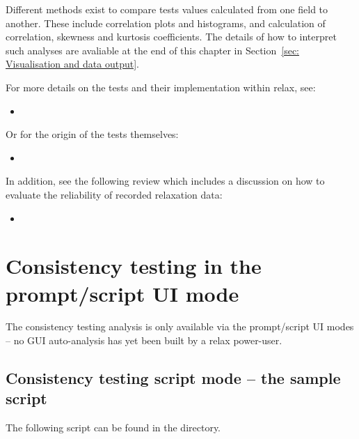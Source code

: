 Different methods exist to compare tests values calculated from one field to another.
These include correlation plots and histograms, and calculation of correlation, skewness and kurtosis coefficients.
The details of how to interpret such analyses are avaliable at the end of this chapter in Section~\ref{sec: Visualisation and data output}.

For more details on the tests and their implementation within relax, see:
\begin{itemize}
  \item {}
\end{itemize}

Or for the origin of the tests themselves:
\begin{itemize}
  \item {}
\end{itemize}

In addition, see the following review which includes a discussion on how to evaluate the reliability of recorded relaxation data:
\begin{itemize}
  \item {}
\end{itemize}




\section{Consistency testing in the prompt/script UI mode}

The consistency testing analysis is only available via the prompt/script UI modes -- no GUI auto-analysis has yet been built by a relax power-user.



\subsection{Consistency testing script mode -- the sample script} \label{sect: consistency tests - sample script}

The following script can be found in the  directory.

